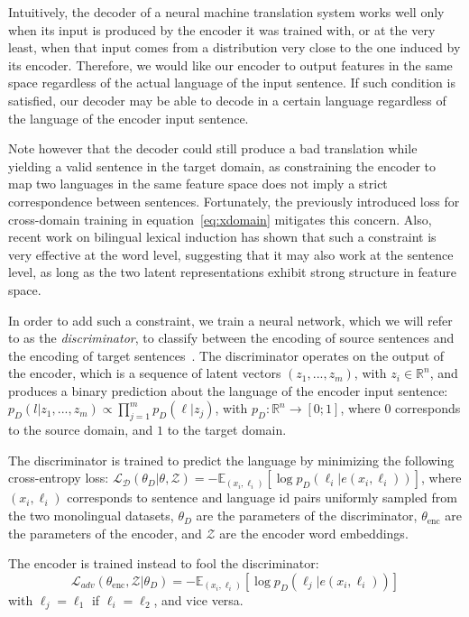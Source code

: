 \documentclass{article} \usepackage{iclr2018_conference,times}
\begin{document}
Intuitively, the decoder of a neural machine translation system works well only when its input is produced by the encoder it was trained with, or at the very least, when that input comes from a distribution very close to the one induced by its encoder. Therefore, we would like our encoder to output features in the same space regardless of the actual language of the input sentence. If such condition is satisfied, our decoder may be able to decode in a certain language regardless of the language of the encoder input sentence.

Note however that the decoder could still produce a bad translation while yielding a valid sentence in the target domain, as constraining the encoder to map two languages in the same feature space does not imply a strict correspondence between sentences. Fortunately, the previously introduced loss for cross-domain training in equation~\ref{eq:xdomain} mitigates this concern. Also, recent work on bilingual lexical induction has shown that such a constraint is very effective at the word level, suggesting that it may also work at the sentence level, as long as the two latent representations exhibit strong structure in feature space.

In order to add such a constraint, we train a neural network, which we will refer to as the \textit{discriminator}, to classify between the encoding of source sentences and the encoding of target sentences~\citep{ganin}. The discriminator operates on the output of the encoder, which is a sequence of latent vectors $(z_1,...,z_m)$, with $z_i \in \mathbb{R}^n$, and produces a binary prediction about the language of the encoder input sentence: $p_D(l | z_1,...,z_m) \propto \prod\limits_{j=1}^m p_D(\ell | z_j)$, with $p_D : \mathbb{R}^n \rightarrow [0;1]$, where $0$ corresponds to the source domain, and $1$ to the target domain. 

The discriminator is trained to predict the language by minimizing the following cross-entropy loss:
$ \mathcal{L_D}(\theta_D | \theta,\mathcal{Z}) = -\mathbb{E}_{(x_i, \ell_i)}[\log p_D(\ell_i | e(x_i, \ell_i))]$, where $(x_i, \ell_i)$ corresponds to sentence and language id pairs uniformly sampled from the two monolingual datasets, $\theta_D$ are the parameters of the discriminator, $\theta_\mathrm{enc}$ are the parameters of the encoder, and $\mathcal{Z}$ are the encoder word embeddings.

The encoder is trained instead to fool the discriminator:
\begin{equation}
\mathcal{L}_{adv}(\theta_\mathrm{enc},\mathcal{Z} | \theta_D) = 
 -\mathbb{E}_{(x_i,\ell_i)}[ \log p_D(\ell_j | e(x_i, \ell_i))]
\end{equation}
with $\ell_j = \ell_1$ if $\ell_i = \ell_2$, and vice versa.
\end{document}
